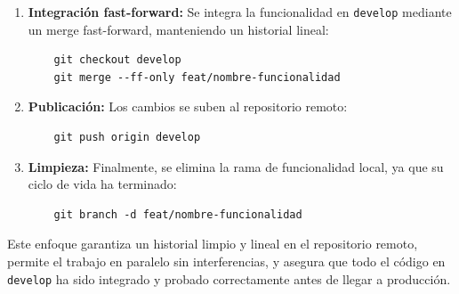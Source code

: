 \begin{enumerate}
    \item \textbf{Integración fast-forward:} Se integra la funcionalidad en 
    \texttt{develop} mediante un merge fast-forward, manteniendo un historial lineal:
    \begin{verbatim}
    git checkout develop
    git merge --ff-only feat/nombre-funcionalidad
    \end{verbatim}
    
    \item \textbf{Publicación:} Los cambios se suben al repositorio remoto:
    \begin{verbatim}
    git push origin develop
    \end{verbatim}
    
    \item \textbf{Limpieza:} Finalmente, se elimina la rama de funcionalidad local, 
    ya que su ciclo de vida ha terminado:
    \begin{verbatim}
    git branch -d feat/nombre-funcionalidad
    \end{verbatim}
\end{enumerate}

Este enfoque garantiza un historial limpio y lineal en el repositorio remoto, 
permite el trabajo en paralelo sin interferencias, y asegura que todo el código 
en \texttt{develop} ha sido integrado y probado correctamente antes de llegar a producción.